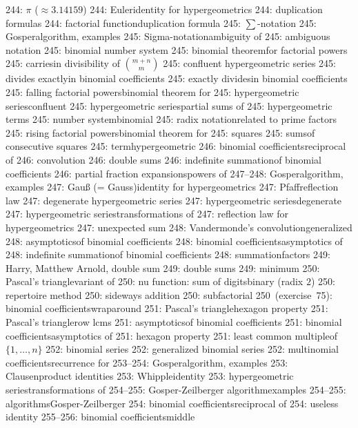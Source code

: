 244: $\pi$ ($\approx3.14159$)
244: Euler\sub identity for hypergeometrics
244: duplication formulas
244: factorial function\sub duplication formula
245: $\sum$-notation
245: Gosper\sub algorithm, examples
245: Sigma-notation\sub ambiguity of
245: ambiguous notation
245: binomial number system
245: binomial theorem\sub for factorial powers
245: carries\sub in divisibility of $m+n\choose m$
245: confluent hypergeometric series
245: divides exactly\sub in binomial coefficients
245: exactly divides\sub in binomial coefficients
245: falling factorial powers\sub binomial theorem for
245: hypergeometric series\sub confluent
245: hypergeometric series\sub partial sums of
245: hypergeometric terms
245: number system\sub binomial
245: radix notation\sub related to prime factors
245: rising factorial powers\sub binomial theorem for
245: squares
245: sums\sub of consecutive squares
245: term\sub hypergeometric
246: binomial coefficients\sub reciprocal of
246: convolution
246: double sums
246: indefinite summation\sub of binomial coefficients
246: partial fraction expansions\sub powers of
247--248: Gosper\sub algorithm, examples
247: Gau{\ss} (= Gauss)\sub identity for hypergeometrics
247: Pfaff\sub reflection law
247: degenerate hypergeometric series
247: hypergeometric series\sub degenerate
247: hypergeometric series\sub transformations of
247: reflection law for hypergeometrics
247: unexpected sum
248: Vandermonde's convolution\sub generalized
248: asymptotics\sub of binomial coefficients
248: binomial coefficients\sub asymptotics of
248: indefinite summation\sub of binomial coefficients
248: summation\sub factors
249: Harry, Matthew Arnold, double sum
249: double sums
249: minimum
250: Pascal's triangle\sub variant of
250: nu function: sum of digits\sub binary (radix $2$)
250: repertoire method
250: sideways addition
250: subfactorial
250~(exercise~75): binomial coefficients\sub wraparound
251: Pascal's triangle\sub hexagon property
251: Pascal's triangle\sub row lcms
251: asymptotics\sub of binomial coefficients
251: binomial coefficients\sub asymptotics of
251: hexagon property
251: least common multiple\sub of $\{1,\ldots,n\}$
252: binomial series
252: generalized binomial series
252: multinomial coefficients\sub recurrence for
253--254: Gosper\sub algorithm, examples
253: Clausen\sub product identities
253: Whipple\sub identity
253: hypergeometric series\sub transformations of
254--255: Gosper-Zeilberger algorithm\sub examples
254--255: algorithms\sub Gosper-Zeilberger
254: binomial coefficients\sub reciprocal of
254: useless identity
255--256: binomial coefficients\sub middle
